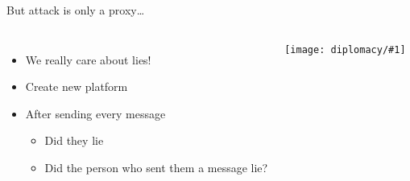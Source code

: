 \documentclass[xcolor=dvipsnames]{beamer}
\newcommand{\gfxd}[2]{
\begin{center}
	\texttt{[image: diplomacy/\#1]}
\end{center}
}
\begin{document}
\begin{frame}[plain]

\end{frame}


\begin{frame}{But attack is only a proxy\dots}

  \begin{columns}
  \begin{itemize}
  \item We really care about lies!
  \item Create new platform
  \item After sending every message
    \begin{itemize}
    \item Did they lie
    \item Did the person who sent them a message lie?
    \end{itemize}
  \end{itemize}
    \gfxd{interface}{.9}
 \end{columns}
\end{frame}
\end{document}
